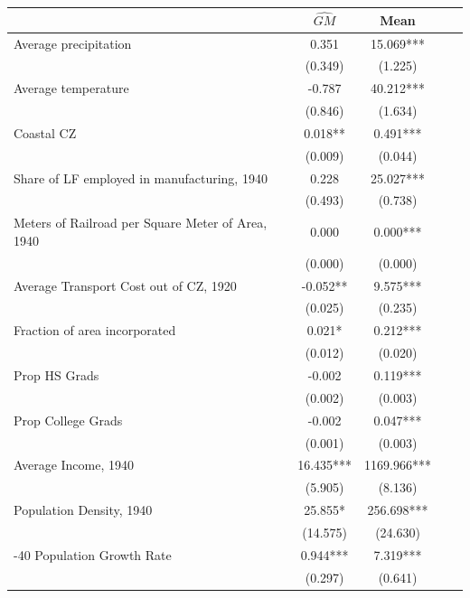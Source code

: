  \begin{tabular}{l*{4}{c}} \toprule
                &\multicolumn{1}{c}{$\widehat{GM}$}&\multicolumn{1}{c}{Mean}\\
\midrule
Average precipitation&    0.351   &   15.069***\\
                &  (0.349)   &  (1.225)   \\
\addlinespace
Average temperature&   -0.787   &   40.212***\\
                &  (0.846)   &  (1.634)   \\
\addlinespace
Coastal CZ      &    0.018** &    0.491***\\
                &  (0.009)   &  (0.044)   \\
\addlinespace
Share of LF employed in manufacturing, 1940&    0.228   &   25.027***\\
                &  (0.493)   &  (0.738)   \\
\addlinespace
Meters of Railroad per Square Meter of Area, 1940&    0.000   &    0.000***\\
                &  (0.000)   &  (0.000)   \\
\addlinespace
Average Transport Cost out of CZ, 1920&   -0.052** &    9.575***\\
                &  (0.025)   &  (0.235)   \\
\addlinespace
Fraction of area incorporated&    0.021*  &    0.212***\\
                &  (0.012)   &  (0.020)   \\
\addlinespace
Prop HS Grads   &   -0.002   &    0.119***\\
                &  (0.002)   &  (0.003)   \\
\addlinespace
Prop College Grads&   -0.002   &    0.047***\\
                &  (0.001)   &  (0.003)   \\
\addlinespace
Average Income, 1940&   16.435***& 1169.966***\\
                &  (5.905)   &  (8.136)   \\
\addlinespace
Population Density, 1940&   25.855*  &  256.698***\\
                & (14.575)   & (24.630)   \\
\addlinespace
1930-40 Population Growth Rate&    0.944***&    7.319***\\
                &  (0.297)   &  (0.641)   \\
       \bottomrule \end{tabular}

